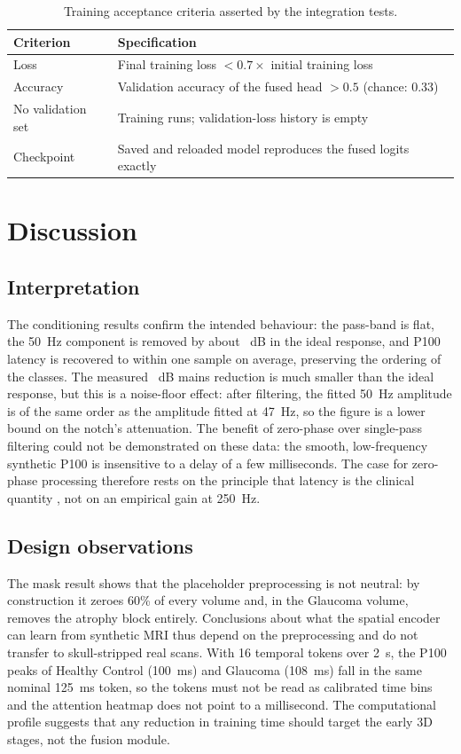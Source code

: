 \documentclass{ieeeaccessapprox}
\begin{document}
\begin{table}[!t]
\caption{Training acceptance criteria asserted by the integration tests.}
\label{tab:accept}
\centering\footnotesize
\begin{tabular}{@{}p{}p{}@{}}
\toprule
Criterion & Specification\\
\midrule
Loss & Final training loss $<0.7\times$ initial training loss\\
Accuracy & Validation accuracy of the fused head $>0.5$ (chance: 0.33)\\
No validation set & Training runs; validation-loss history is empty\\
Checkpoint & Saved and reloaded model reproduces the fused logits exactly\\
\bottomrule
\end{tabular}
\end{table}

\section{Discussion}\label{sec:discussion}
\subsection{Interpretation}
The conditioning results confirm the intended behaviour: the pass-band is flat, the 50~Hz component is removed by about \notchDb~dB in the ideal response, and P100 latency is recovered to within one sample on average, preserving the ordering of the classes. The measured \nMainsDb~dB mains reduction is much smaller than the ideal response, but this is a noise-floor effect: after filtering, the fitted 50~Hz amplitude is of the same order as the amplitude fitted at 47~Hz, so the figure is a lower bound on the notch's attenuation. The benefit of zero-phase over single-pass filtering could not be demonstrated on these data: the smooth, low-frequency synthetic P100 is insensitive to a delay of a few milliseconds. The case for zero-phase processing therefore rests on the principle that latency is the clinical quantity \cite{odom2016}, not on an empirical gain at 250~Hz.

\subsection{Design observations}
The mask result shows that the placeholder preprocessing is not neutral: by construction it zeroes 60\% of every volume and, in the Glaucoma volume, removes the atrophy block entirely. Conclusions about what the spatial encoder can learn from synthetic MRI thus depend on the preprocessing and do not transfer to skull-stripped real scans. With 16 temporal tokens over 2~s, the P100 peaks of Healthy Control (100~ms) and Glaucoma (108~ms) fall in the same nominal 125~ms token, so the tokens must not be read as calibrated time bins and the attention heatmap does not point to a millisecond. The computational profile suggests that any reduction in training time should target the early 3D stages, not the fusion module.
\end{document}
